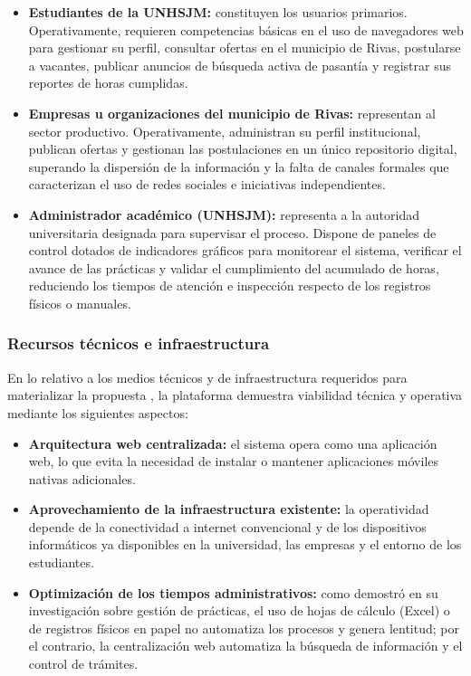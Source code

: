 \begin{itemize}
	\item \textbf{Estudiantes de la UNHSJM:} constituyen los usuarios primarios. Operativamente, requieren competencias básicas en el uso de navegadores web para gestionar su perfil, consultar ofertas en el municipio de Rivas, postularse a vacantes, publicar anuncios de búsqueda activa de pasantía y registrar sus reportes de horas cumplidas.
	\item \textbf{Empresas u organizaciones del municipio de Rivas:} representan al sector productivo. Operativamente, administran su perfil institucional, publican ofertas y gestionan las postulaciones en un único repositorio digital, superando la dispersión de la información y la falta de canales formales que caracterizan el uso de redes sociales e iniciativas independientes.
	\item \textbf{Administrador académico (UNHSJM):} representa a la autoridad universitaria designada para supervisar el proceso. Dispone de paneles de control dotados de indicadores gráficos para monitorear el sistema, verificar el avance de las prácticas y validar el cumplimiento del acumulado de horas, reduciendo los tiempos de atención e inspección respecto de los registros físicos o manuales.
\end{itemize}

\subsubsection{Recursos técnicos e infraestructura}

En lo relativo a los medios técnicos y de infraestructura requeridos para materializar la propuesta \parencite{dubsdemoya2002}, la plataforma demuestra viabilidad técnica y operativa mediante los siguientes aspectos:

\begin{itemize}
	\item \textbf{Arquitectura web centralizada:} el sistema opera como una aplicación web, lo que evita la necesidad de instalar o mantener aplicaciones móviles nativas adicionales.
	\item \textbf{Aprovechamiento de la infraestructura existente:} la operatividad depende de la conectividad a internet convencional y de los dispositivos informáticos ya disponibles en la universidad, las empresas y el entorno de los estudiantes.
	\item \textbf{Optimización de los tiempos administrativos:} como demostró \textcite{torresremon2022} en su investigación sobre gestión de prácticas, el uso de hojas de cálculo (Excel) o de registros físicos en papel no automatiza los procesos y genera lentitud; por el contrario, la centralización web automatiza la búsqueda de información y el control de trámites.
\end{itemize}

